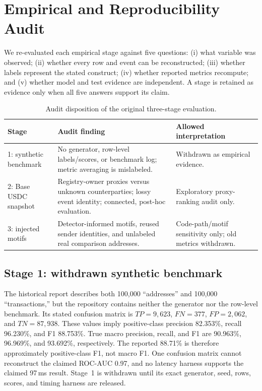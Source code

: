 
\section{Empirical and Reproducibility Audit}\label{sec:evaluation}

We re-evaluated each empirical stage against five questions: (i) what variable
was observed; (ii) whether every row and event can be reconstructed; (iii)
whether labels represent the stated construct; (iv) whether reported metrics
recompute; and (v) whether model and test evidence are independent.  A stage is
retained as evidence only when all five answers support its claim.

\begin{table}[h]
\centering
\caption{Audit disposition of the original three-stage evaluation.}
\label{tab:audit_disposition}
\small
\begin{tabularx}{\textwidth}{@{}l X X@{}}
\toprule
\textbf{Stage} & \textbf{Audit finding} & \textbf{Allowed interpretation} \\
\midrule
1: synthetic benchmark & No generator, row-level labels/scores, or benchmark log; metric averaging is mislabeled. & Withdrawn as empirical evidence. \\
2: Base USDC snapshot & Registry-owner proxies versus unknown counterparties; lossy event identity; connected, post-hoc evaluation. & Exploratory proxy-ranking audit only. \\
3: injected motifs & Detector-informed motifs, reused sender identities, and unlabeled real comparison addresses. & Code-path/motif sensitivity only; old metrics withdrawn. \\
\bottomrule
\end{tabularx}
\end{table}

\subsection{Stage 1: withdrawn synthetic benchmark}

The historical report describes both 100,000 ``addresses'' and 100,000
``transactions,'' but the repository contains neither the generator nor the
row-level benchmark.  Its stated confusion matrix is
$TP=9{,}623$, $FN=377$, $FP=2{,}062$, and $TN=87{,}938$.  These values imply
positive-class precision 82.353\%, recall 96.230\%, and F1 88.753\%.
True macro precision, recall, and F1 are 90.963\%, 96.969\%, and 93.692\%,
respectively.  The reported 88.71\% is therefore approximately positive-class
F1, not macro F1.  One confusion matrix cannot reconstruct the claimed
ROC-AUC 0.97, and no latency harness supports the claimed 97\,ms result.
Stage~1 is withdrawn until its exact generator, seed, rows, scores, and timing
harness are released.


